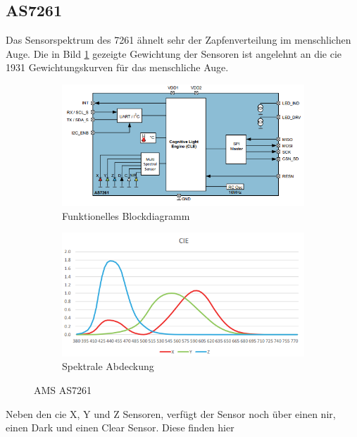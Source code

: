 \documentclass[11pt]{scrartcl}
\begin{document}
\subsection{AS7261}
Das Sensorspektrum des 7261 ähnelt sehr der Zapfenverteilung im menschlichen Auge. Die in Bild \ref{fig:AS7261_spectrum} gezeigte
Gewichtung der Sensoren ist angelehnt an die \ac{cie} 1931 Gewichtungskurven für das menschliche Auge. 
\begin{figure}[H]
    \centering
    \begin{subfigure}[b]{0.49\textwidth}
        \includegraphics[width=\textwidth]{images/AS7261_functional_blockdiagram.png}
        \caption{Funktionelles Blockdiagramm}
    \end{subfigure}
    \hfill 
    \begin{subfigure}[b]{0.49\textwidth}
        \includegraphics[width=\textwidth]{images/AS7261_spectrum.png}
        \caption{Spektrale Abdeckung}\label{fig:AS7261_spectrum}
    \end{subfigure}
    \caption{AMS AS7261 \cite{datasheet61}}\label{fig:AS7261}
\end{figure}
\noindent
Neben den \ac{cie} X, Y und Z Sensoren, verfügt der Sensor noch über einen \ac{nir}, einen Dark und einen Clear Sensor. Diese finden hier
\end{document}
